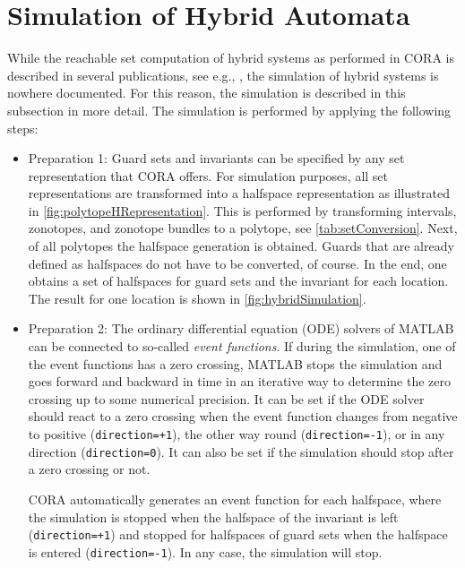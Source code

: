 \section{Simulation of Hybrid Automata} \label{sec:simulationHybridAutomaton}

While the reachable set computation of hybrid systems as performed in CORA is described in several publications, see e.g., \cite{Althoff2010d,Althoff2010a,Althoff2012a}, the simulation of hybrid systems is nowhere documented. For this reason, the simulation is described in this subsection in more detail. The simulation is performed by applying the following steps:
\begin{itemize}
 \item[\ding{192}] Preparation 1: Guard sets and invariants can be specified by any set representation that CORA offers. For simulation purposes, all set representations are transformed into a halfspace representation as illustrated in \cref{fig:polytopeHRepresentation}. This is performed by transforming intervals, zonotopes, and zonotope bundles to a polytope, see \cref{tab:setConversion}. Next, of all polytopes the halfspace generation is obtained. Guards that are already defined as halfspaces do not have to be converted, of course. In the end, one obtains a set of halfspaces for guard sets and the invariant for each location. The result for one location is shown in \cref{fig:hybridSimulation}.
 
 \item[\ding{193}] Preparation 2: The ordinary differential equation (ODE) solvers of MATLAB can be connected to so-called \textit{event functions}. If during the simulation, one of the event functions has a zero crossing, MATLAB stops the simulation and goes forward and backward in time in an iterative way to determine the zero crossing up to some numerical precision. It can be set if the ODE solver should react to a zero crossing when the event function changes from negative to positive (\texttt{direction=+1}), the other way round (\texttt{direction=-1}), or in any direction (\texttt{direction=0}). It can also be set if the simulation should stop after a zero crossing or not. 
 
 CORA automatically generates an event function for each halfspace, where the simulation is stopped when the halfspace of the invariant is left (\texttt{direction=+1}) and stopped for halfspaces of guard sets when the halfspace is entered (\texttt{direction=-1}). In any case, the simulation will stop.
 

\end{itemize}
